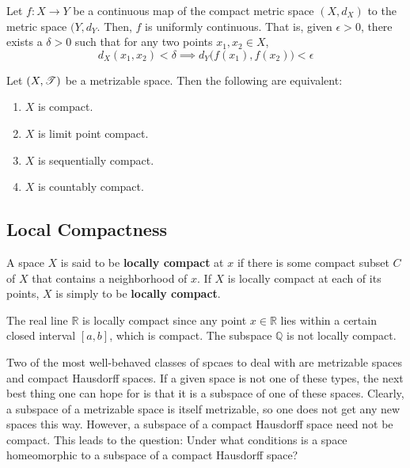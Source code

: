     \begin{theorem}
      Let $f: X \rightarrow Y$ be a continuous map of the compact metric space $(X,d_X)$ to the metric space $(Y, d_Y$. Then, $f$ is uniformly continuous. That is, given $\epsilon > 0$, there exists a $\delta > 0$ such that for any two points $x_1, x_2 \in X$, 
      \begin{equation}
        d_X (x_1, x_2) < \delta \implies d_Y \big( f(x_1), f(x_2)\big) < \epsilon
      \end{equation}
    \end{theorem}

    \begin{theorem}
      Let $(X, \operatorname{\mathscr{T}})$ be a metrizable space. Then the following are equivalent: 
      \begin{enumerate}
        \item $X$ is compact. 
        \item $X$ is limit point compact. 
        \item $X$ is sequentially compact. 
        \item $X$ is countably compact. 
      \end{enumerate}
    \end{theorem}

  \subsection{Local Compactness}

    \begin{definition}
      A space $X$ is said to be \textbf{locally compact} at $x$ if there is some compact subset $C$ of $X$ that contains a neighborhood of $x$. If $X$ is locally compact at each of its points, $X$ is simply to be \textbf{locally compact}. 
    \end{definition}

    \begin{example}
      The real line $\mathbb{R}$ is locally compact since any point $x \in \mathbb{R}$ lies within a certain closed interval $[a,b]$, which is compact. The subspace $\mathbb{Q}$ is not locally compact. 
    \end{example}

    Two of the most well-behaved classes of spcaes to deal with are metrizable spaces and compact Hausdorff spaces. If a given space is not one of these types, the next best thing one can hope for is that it is a subspace of one of these spaces. Clearly, a subspace of a metrizable space is itself metrizable, so one does not get any new spaces this way. However, a subspace of a compact Hausdorff space need not be compact. This leads to the question: Under what conditions is a space homeomorphic to a subspace of a compact Hausdorff space? 

